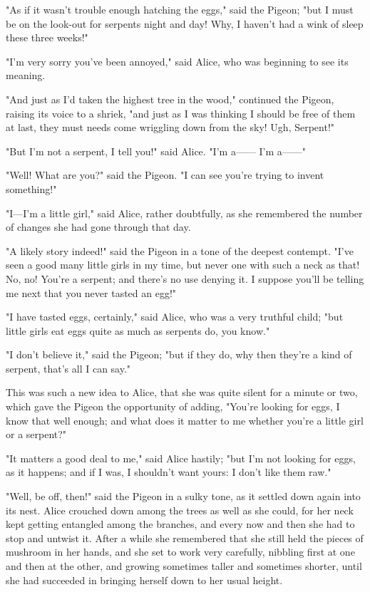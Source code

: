 "As if it wasn't trouble enough hatching the eggs," said the Pigeon; "but I must be on ​the look-out for serpents night and day! Why, I haven't had a wink of sleep these three weeks!"

"I'm very sorry you've been annoyed," said Alice, who was beginning to see its meaning.

"And just as I'd taken the highest tree in the wood," continued the Pigeon, raising its voice to a shriek, "and just as I was thinking I should be free of them at last, they must needs come wriggling down from the sky! Ugh, Serpent!"

"But I'm not a serpent, I tell you!" said Alice. "I'm a—— I'm a——"

"Well! What are you?" said the Pigeon. "I can see you're trying to invent something!"

"I—I'm a little girl," said Alice, rather doubtfully, as she remembered the number of changes she had gone through that day.

"A likely story indeed!" said the Pigeon in a tone of the deepest contempt. "I've seen a good many little girls in my time, but never one with such a neck as that! No, no! You're a ​serpent; and there's no use denying it. I suppose you'll be telling me next that you never tasted an egg!"

"I have tasted eggs, certainly," said Alice, who was a very truthful child; "but little girls eat eggs quite as much as serpents do, you know."

"I don't believe it," said the Pigeon; "but if they do, why then they're a kind of serpent, that's all I can say."

This was such a new idea to Alice, that she was quite silent for a minute or two, which gave the Pigeon the opportunity of adding, "You're looking for eggs, I know that well enough; and what does it matter to me whether you're a little girl or a serpent?"

"It matters a good deal to me," said Alice hastily; "but I'm not looking for eggs, as it happens; and if I was, I shouldn't want yours: I don't like them raw."

"Well, be off, then!" said the Pigeon in a sulky tone, as it settled down again into its ​nest. Alice crouched down among the trees as well as she could, for her neck kept getting entangled among the branches, and every now and then she had to stop and untwist it. After a while she remembered that she still held the pieces of mushroom in her hands, and she set to work very carefully, nibbling first at one and then at the other, and growing sometimes taller and sometimes shorter, until she had succeeded in bringing herself down to her usual height.

